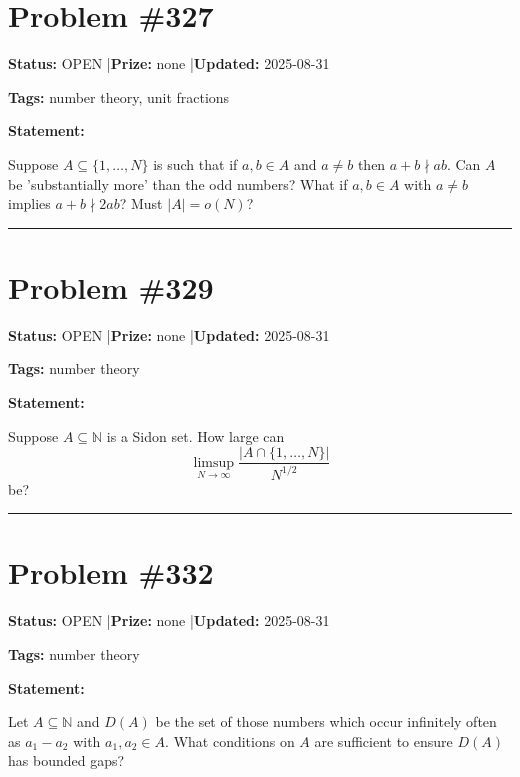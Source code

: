 \documentclass{article}
\begin{document}
\section{Problem \#327}
\label{prob:327}

\noindent\textbf{Status:} OPEN \quad|\quad \textbf{Prize:} none \quad|\quad \textbf{Updated:} 2025-08-31

\noindent\textbf{Tags:} number theory, unit fractions

\medskip

\noindent\textbf{Statement:}

Suppose $A\subseteq \{1,\ldots,N\}$ is such that if $a,b\in A$ and $a\neq b$ then $a+b\nmid ab$. Can $A$ be 'substantially more' than the odd numbers? What if $a,b\in A$ with $a\neq b$ implies $a+b\nmid 2ab$? Must $\lvert A\rvert=o(N)$?

\noindent\rule{\linewidth}{0.4pt}


\section{Problem \#329}
\label{prob:329}

\noindent\textbf{Status:} OPEN \quad|\quad \textbf{Prize:} none \quad|\quad \textbf{Updated:} 2025-08-31

\noindent\textbf{Tags:} number theory

\medskip

\noindent\textbf{Statement:}

Suppose $A\subseteq \mathbb{N}$ is a Sidon set. How large can\[\limsup_{N\to \infty}\frac{\lvert A\cap \{1,\ldots,N\}\rvert}{N^{1/2}}\]be?

\noindent\rule{\linewidth}{0.4pt}


\section{Problem \#332}
\label{prob:332}

\noindent\textbf{Status:} OPEN \quad|\quad \textbf{Prize:} none \quad|\quad \textbf{Updated:} 2025-08-31

\noindent\textbf{Tags:} number theory

\medskip

\noindent\textbf{Statement:}

Let $A\subseteq \mathbb{N}$ and $D(A)$ be the set of those numbers which occur infinitely often as $a_1-a_2$ with $a_1,a_2\in A$. What conditions on $A$ are sufficient to ensure $D(A)$ has bounded gaps?
\end{document}

